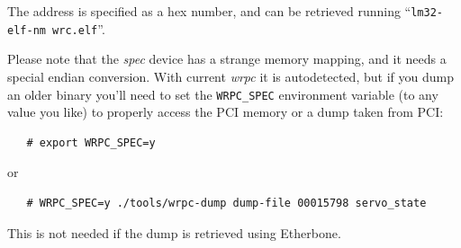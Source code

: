 \documentclass[a4paper, 12pt]{article}
\begin{document}
The address is specified as a hex number, and can be retrieved running
``\texttt{lm32-elf-nm  wrc.elf}''.

Please note that the \textit{spec} device has a strange memory mapping, and
it needs a special endian conversion. With current \textit{wrpc} it is
autodetected, but if you dump an older binary you'll need to set the
\texttt{WRPC\_SPEC} environment variable (to any value you like) to properly
access the PCI memory or a dump taken from PCI:

\begin{lstlisting}
   # export WRPC_SPEC=y
\end{lstlisting}

or

\begin{lstlisting}
   # WRPC_SPEC=y ./tools/wrpc-dump dump-file 00015798 servo_state
\end{lstlisting}

This is not needed if the dump is retrieved using Etherbone.

\end{document}

